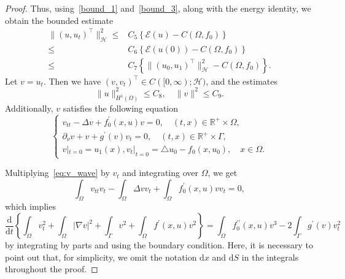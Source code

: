 \documentclass{elsarticle}
\begin{document}
\begin{proof}
Thus, using~\eqref{bound_1} and~\eqref{bound_3}, along with the energy identity, we obtain the bounded estimate
\begin{equation*}
\begin{split}
\|(u, u_t)^\top\|^2_{\mathcal{H}}\leqslant &C_5\left\{\mathcal{E}(u) - C(\Omega, f_0)\right\}\\
\leqslant &C_6\left\{\mathcal{E}(u(0)) - C(\Omega, f_0)\right\}\\
\leqslant &C_7\left\{\|(u_0, u_1)^\top\|^2_{\mathcal{H}} - C(\Omega, f_0)\right\}.
\end{split}
\end{equation*}
Let $v=u_t$. Then we have $(v, v_t)^\top \in C([0, \infty); \mathcal{H})$, and the estimates
\begin{equation}\label{bound_inH}
\|u\|^2_{H^1(\Omega)} \leqslant C_8, \quad \|v\|^2 \leqslant C_9.
\end{equation}
Additionally, $v$ satisfies the following equation
\begin{equation}\label{eq:v_wave}
\left
    \{
        \begin{array}{l}
	v_{tt} - \Delta v +f^{\prime}_0(x, u)v = 0, \quad (t, x)\in\mathbb{R}^{+} \times \Omega,\\
	\partial_{\nu}v + v +  g^{\prime}(v)v_t = 0,  \quad (t, x)\in \mathbb{R}^{+} \times \Gamma,\\
	v|_{t=0} = u_{1}(x),  v_{t}|_{t=0} = \triangle u_{0} - f_0(x, u_0), \quad  x\in \Omega. 
        \end{array}
\right.
\end{equation}

Multiplying~\eqref{eq:v_wave} by $v_t$ and integrating over $\Omega$, we get
\begin{equation*}
    \int_{\Omega}v_{tt}v_t - \int_{\Omega}\Delta v v_t +\int_{\Omega}f^{\prime}_0(x, u)vv_t=0,
\end{equation*}
which implies
\begin{equation} \label{L2-1}
    \frac{\mathrm{d}}{\mathrm{d}t}\left\{\int_{\Omega}v_{t}^2+\int_{\Omega}|\nabla v|^2+\int_{\Gamma}v^2 +\int_{\Omega}f^{\prime}(x, u)v^2\right\}=\int_{\Omega}f_0^{\prime\prime}(x, u)v^3-2\int_{\Gamma} g^{\prime}(v)v_t^2
\end{equation}	
by integrating by parts and using the boundary condition. Here, it is necessary to point out that, for simplicity, we omit the notation $\mathrm{d}x$ and $\mathrm{d}S$ in the integrals throughout the proof.


\end{proof}
\end{document}
